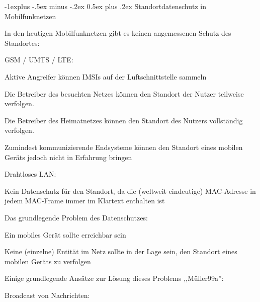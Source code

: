 \documentclass[a4paper]{article}
\makeatletter
\renewcommand{\subsection}{\@startsection{subsection}{2}{0mm}%
 {-1explus -.5ex minus -.2ex}%
 {0.5ex plus .2ex}%
 {\normalfont\normalsize\bfseries}}
\makeatother
\begin{document}
\begin{multicols}{3}
      \subsection{Standortdatenschutz in Mobilfunknetzen}
      \begin{itemize*}
            \item In den heutigen Mobilfunknetzen gibt es keinen angemessenen Schutz des Standortes:
            \begin{itemize*}
                  \item GSM / UMTS / LTE:
                  \begin{itemize*}
                        \item Aktive Angreifer können IMSIs auf der Luftschnittstelle sammeln
                        \item Die Betreiber des besuchten Netzes können den Standort der Nutzer teilweise verfolgen.
                        \item Die Betreiber des Heimatnetzes können den Standort des Nutzers vollständig verfolgen.
                        \item Zumindest kommunizierende Endsysteme können den Standort eines mobilen Geräts jedoch nicht in Erfahrung bringen
                  \end{itemize*}
            \end{itemize*}
            \item Drahtloses LAN:
            \begin{itemize*}
                  \item Kein Datenschutz für den Standort, da die (weltweit eindeutige) MAC-Adresse in jedem MAC-Frame immer im Klartext enthalten ist
            \end{itemize*}
            \item Das grundlegende Problem des Datenschutzes:
            \begin{itemize*}
                  \item Ein mobiles Gerät sollte erreichbar sein
                  \item Keine (einzelne) Entität im Netz sollte in der Lage sein, den Standort eines mobilen Geräts zu verfolgen
            \end{itemize*}
            \item Einige grundlegende Ansätze zur Lösung dieses Problems
            ,,Müller99a'':
            \begin{itemize*}
                  \item Broadcast von Nachrichten:

\end{itemize*}
\end{itemize*}
\end{multicols}
\end{document}
